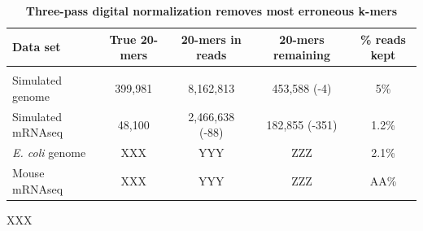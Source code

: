 \documentclass[10pt,draft]{article}
\begin{document}
\begin{table}[!ht]
\caption{
\bf{Three-pass digital normalization removes most erroneous k-mers}}
\begin{tabular}{|l|c|c|c|c|}
Data set & True 20-mers & 20-mers in reads & 20-mers remaining & \% reads kept\\
\hline \\
Simulated genome & 399,981 & 8,162,813 & 453,588 (-4) & 5\% \\
Simulated mRNAseq & 48,100 & 2,466,638 (-88) & 182,855 (-351) & 1.2\% \\
{\em E. coli} genome & XXX & YYY & ZZZ & 2.1\% \\
Mouse mRNAseq & XXX & YYY & ZZZ & AA\% \\
\end{tabular}
\begin{flushleft} XXX
\end{flushleft}
\label{tab:normC5}
\end{table}
\end{document}
